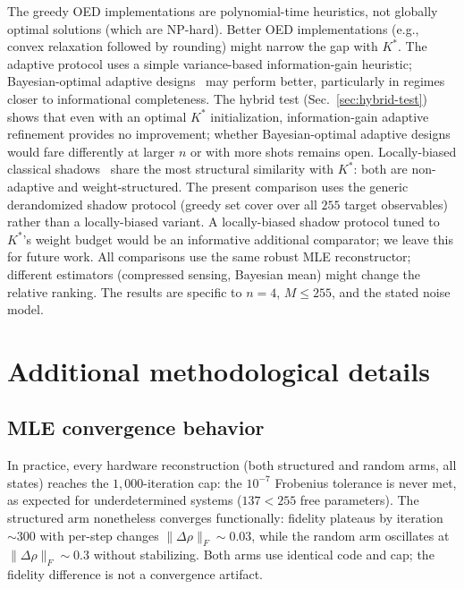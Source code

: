 \documentclass[twocolumn,prx,aps,superscriptaddress,longbibliography]{revtex4-2}
\begin{document}
The greedy OED implementations are polynomial-time heuristics, not
globally optimal solutions (which are NP-hard).  Better OED
implementations (e.g., convex relaxation followed by rounding) might
narrow the gap with $K^*$.  The adaptive protocol uses a simple
variance-based information-gain heuristic; Bayesian-optimal adaptive
designs~\cite{Huszar2012} may perform better, particularly in regimes
closer to informational completeness.  The hybrid test
(Sec.~\ref{sec:hybrid-test}) shows that even with an optimal
$K^*$ initialization, information-gain adaptive refinement provides
no improvement; whether Bayesian-optimal adaptive designs would
fare differently at larger $n$ or with more shots remains open.
Locally-biased classical shadows~\cite{Hadfield2022} share the most
structural similarity with $K^*$: both are non-adaptive and
weight-structured.  The present comparison uses the generic
derandomized shadow protocol (greedy set cover over all $255$
target observables) rather than a locally-biased variant.  A
locally-biased shadow protocol tuned to $K^*$'s weight budget would
be an informative additional comparator; we leave this for future
work.
All comparisons use the same
robust MLE reconstructor; different estimators (compressed sensing,
Bayesian mean) might change the relative ranking.  The results are
specific to $n = 4$, $M \leq 255$, and the stated noise model.


\section{Additional methodological details}
\label{sec:additional-details}

\subsection{MLE convergence behavior}
\label{sec:convergence}

In practice, every hardware reconstruction (both structured and random
arms, all states) reaches the $1{,}000$-iteration cap: the
$10^{-7}$ Frobenius tolerance is never met, as expected for
underdetermined systems ($137 < 255$ free parameters).  The
structured arm nonetheless converges functionally: fidelity
plateaus by iteration~${\sim}300$ with per-step changes
$\|\Delta\rho\|_F \sim 0.03$, while the random arm oscillates
at $\|\Delta\rho\|_F \sim 0.3$ without stabilizing.  Both
arms use identical code and cap; the fidelity
difference is not a convergence artifact.
\end{document}
